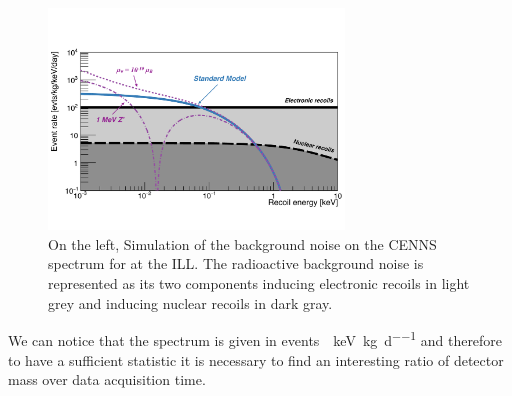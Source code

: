 \begin{figure}
\centering
\includegraphics[width=0.7\textwidth]{Figures/Introduction/cenns_spectrum_ill.pdf}
\caption{On the left, Simulation of the background noise on the CENNS spectrum for \Ricochet{} at the ILL. The radioactive background noise is represented as its two components inducing electronic recoils in light grey and inducing nuclear recoils in dark gray.}
\label{fig:cenns-new-physics}
\end{figure}

We can notice that the spectrum is given in \si{events \per \kilo\eV \per \kg \per \day} and therefore to have a sufficient statistic it is necessary to find an interesting ratio of detector mass over data acquisition time.


